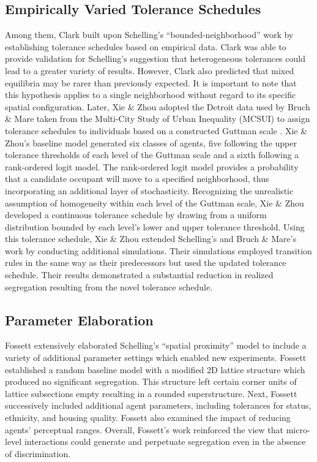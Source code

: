 \documentclass[a4paper]{article}
\begin{document}
\subsection{Empirically Varied Tolerance Schedules}
Among them, Clark \cite{ClarkW.A.V.1991RPaN} built upon Schelling’s “bounded-neighborhood” work by establishing tolerance schedules based on empirical data. Clark was able to provide validation for Schelling’s suggestion that heterogeneous tolerances could lead to a greater variety of results. However, Clark also predicted that mixed equilibria may be rarer than previously expected. It is important to note that this hypothesis applies to a single neighborhood without regard to its specific spatial configuration.
Later, Xie \& Zhou \cite{xie2012modeling} adopted the Detroit data used by Bruch \& Mare \cite{BRUCHElizabethE2006Ncan} taken from the Multi-City Study of Urban Inequality (MCSUI) to assign tolerance schedules to individuals based on a constructed Guttman scale \cite{GuttmanLouis1944ABfS}. Xie \& Zhou’s baseline model generated six classes of agents, five following the upper tolerance thresholds of each level of the Guttman scale and a sixth following a rank-ordered logit model. The rank-ordered logit model provides a probability that a candidate occupant will move to a specified neighborhood, thus incorporating an additional layer of stochasticity. Recognizing the unrealistic assumption of homogeneity within each level of the Guttman scale, Xie \& Zhou developed a continuous tolerance schedule by drawing from a uniform distribution bounded by each level’s lower and upper tolerance threshold. Using this tolerance schedule, Xie \& Zhou extended Schelling’s \cite{schelling1971dynamic} and Bruch \& Mare’s \cite{BRUCHElizabethE2006Ncan} work by conducting additional simulations. Their simulations employed transition rules in the same way as their predecessors but used the updated tolerance schedule. Their results demonstrated a substantial reduction in realized segregation resulting from the novel tolerance schedule.

\subsection{Parameter Elaboration}
Fossett \cite{fossett2006ethnic} extensively elaborated Schelling’s “spatial proximity” model to include a variety of additional parameter settings which enabled new experiments. Fossett established a random baseline model with a modified 2D lattice structure which produced no significant segregation. This structure left certain corner units of lattice subsections empty resulting in a rounded superstructure. Next, Fossett successively included additional agent parameters, including tolerances for status, ethnicity, and housing quality. Fossett also examined the impact of reducing agents’ perceptual ranges. Overall, Fossett’s work reinforced the view that micro-level interactions could generate and perpetuate segregation even in the absence of discrimination.
\end{document}
